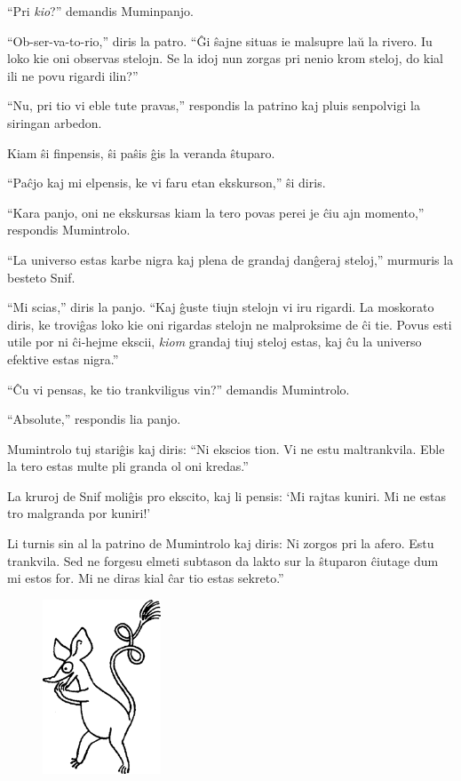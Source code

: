 ``Pri \emph{kio}?'' demandis Muminpanjo.

``Ob-ser-va-to-rio,'' diris la patro. ``Ĝi ŝajne situas ie malsupre laŭ la rivero. Iu loko kie oni observas stelojn. Se la idoj nun zorgas pri nenio krom steloj, do kial ili ne povu rigardi ilin?''

``Nu, pri tio vi eble tute pravas,'' respondis la patrino kaj pluis senpolvigi la siringan arbedon.

Kiam ŝi finpensis, ŝi paŝis ĝis la veranda ŝtuparo.

``Paĉjo kaj mi elpensis, ke vi faru etan ekskurson,'' ŝi diris.

``Kara panjo, oni ne ekskursas kiam la tero povas perei je ĉiu ajn momento,'' respondis Mumintrolo.

``La universo estas karbe nigra kaj plena de grandaj danĝeraj steloj,'' murmuris la besteto Snif.

``Mi scias,'' diris la panjo. ``Kaj ĝuste tiujn stelojn vi iru rigardi. La moskorato diris, ke troviĝas loko kie oni rigardas stelojn ne malproksime de ĉi tie. Povus esti utile por ni ĉi-hejme ekscii, \emph{kiom} grandaj tiuj steloj estas, kaj ĉu la universo efektive estas nigra.''

``Ĉu vi pensas, ke tio trankviligus vin?'' demandis Mumintrolo.

``Absolute,'' respondis lia panjo.

Mumintrolo tuj stariĝis kaj diris: ``Ni ekscios tion. Vi ne estu maltrankvila. Eble la tero estas multe pli granda ol oni kredas.''

La kruroj de Snif moliĝis pro ekscito, kaj li pensis: `Mi rajtas kuniri. Mi ne estas tro malgranda por kuniri!'

Li turnis sin al la patrino de Mumintrolo kaj diris: Ni zorgos pri la afero. Estu trankvila. Sed ne forgesu elmeti subtason da lakto sur la ŝtuparon ĉiutage dum mi estos for. Mi ne diras kial ĉar tio estas sekreto.''

\begin{figure}[htbp]
\centering
\includegraphics[width=100pt,height=147pt]{2-3.png}
\caption{}
\label{2-3}
\end{figure}

